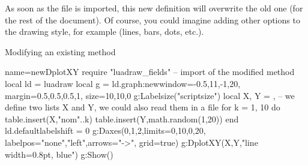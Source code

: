 As soon as the file is imported, this new definition will overwrite the old one (for the rest of the document). Of course, you could imagine adding other options to the drawing style, for example (lines, bars, dots, etc.).

\begin{demo}{Modifying an existing method}
\begin{luadraw}{name=newDplotXY}
require "luadraw_fields" -- import of the modified method
local ld = luadraw
local g = ld.graph:new{window={-0.5,11,-1,20}, margin={0.5,0.5,0.5,1}, size={10,10,0}}
g:Labelsize("scriptsize")
local X, Y = {}, {} -- we define two lists X and Y, we could also read them in a file
for k = 1, 10 do
    table.insert(X,"nom"..k)
    table.insert(Y,math.random(1,20))
end
ld.defaultlabelshift = 0
g:Daxes({0,1,2},{limits={{0,10},{0,20}}, labelpos={"none","left"},arrows="->", grid=true})
g:DplotXY(X,Y,"line width=0.8pt, blue")
g:Show()
\end{luadraw}
\end{demo}
